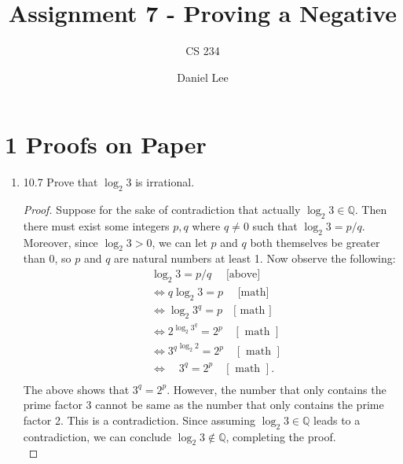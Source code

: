 \documentclass[10pt]{article}
\title{Assignment 7 - Proving a Negative}
\author{CS 234}
\date{Daniel Lee}
\begin{document}
\maketitle

\section*{1 \quad Proofs on Paper}

\begin{enumerate}[label={}]
      \item 10.7 Prove that $\log _2 3$ is irrational.
            \begin{proof}
                  Suppose for the sake of contradiction that actually $\log _2 3 \in \mathbb{Q}$. Then there must exist some integers $p, q$ where $q \neq 0$ such that $\log _2 3=p / q$. Moreover, since $\log _2 3>0$, we can let $p$ and $q$ both themselves be greater than 0, so $p$ and $q$ are natural numbers at least 1.
                  Now observe the following:\\
                  $$
                        \begin{aligned}
                               & \log _2 3=p / q \quad \text { [above] }                     \\
                               & \Leftrightarrow q \log _2 3=p \quad \text { [math] }        \\
                               & \Leftrightarrow \log _2 3^q=p \quad[\text { math ] }        \\
                               & \Leftrightarrow 2^{\log _2 3^q}=2^p \quad[\text { math }]   \\
                               & \Leftrightarrow {3^q}^{\log _2 2}=2^p \quad[\text { math }] \\
                               & \Leftrightarrow \quad 3^q=2^p \quad[\text { math }] .       \\
                        \end{aligned}
                  $$
                  The above shows that $3^q=2^p$. However, the number that only contains the prime factor 3 cannot be same as the number that only contains the prime factor 2. This is a contradiction.
                  Since assuming $\log _2 3 \in \mathbb{Q}$ leads to a contradiction, we can conclude $\log _2 3 \notin \mathbb{Q}$, completing the proof.\\
            \end{proof}


\end{enumerate}
\end{document}
